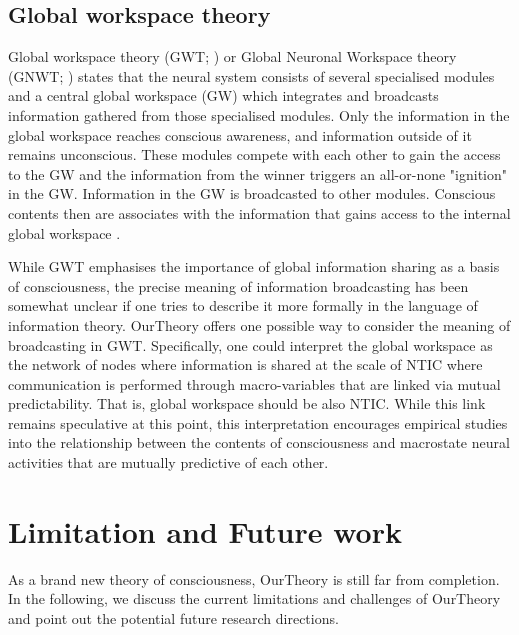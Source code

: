 \documentclass[utf8]{article}
\begin{document}
				
        
		\subsection{Global workspace theory}
		Global workspace theory (GWT; \cite{baars1988cognitive, baars1997theatre, baars2002conscious}) or Global Neuronal Workspace theory (GNWT; \cite{dehaene1998neuronal, dehaene2001towards, dehaene2011experimental}) states that the neural system consists of several specialised modules and a central global workspace (GW) which integrates and broadcasts information gathered from those specialised modules. Only the information in the global workspace reaches conscious awareness, and information outside of it remains unconscious. These modules compete with each other to gain the access to the GW and the information from the winner triggers an all-or-none "ignition" in the GW. Information in the GW is broadcasted to other modules. Conscious contents then are associates with the information that gains access to the internal global workspace \cite{Dehaene2017}.
		
        While GWT emphasises the importance of global information sharing as a basis of consciousness, the precise meaning of information broadcasting has been somewhat unclear if one tries to describe it more formally in the language of information theory. \ac{OurTheory} offers one possible way to consider the meaning of broadcasting in GWT. Specifically, one could interpret the global workspace as the network of nodes where information is shared at the scale of NTIC where communication is performed through macro-variables that are linked via mutual predictability. That is, global workspace should be also NTIC. While this link remains speculative at this point, this interpretation encourages empirical studies into the relationship between the contents of consciousness and macrostate neural activities that are mutually predictive of each other. 
		

    \section{Limitation and Future work}\label{sec:Limitation and Future work}  
        As a brand new theory of consciousness, \ac{OurTheory} is still far from completion. In the following, we discuss the current limitations and challenges of \ac{OurTheory} and point out the potential future research directions.
    
\end{document}
